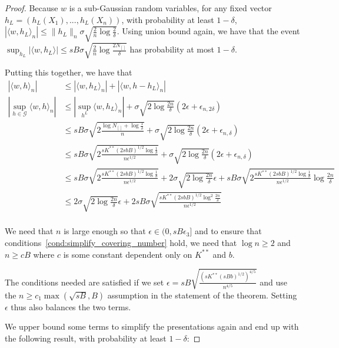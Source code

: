 \begin{proof}
Because $w$ is a sub-Gaussian random variables, for any fixed vector $h_L = (h_L(X_1),...,h_L(X_n))$, with probability at least $1-\delta$, $|\langle w, h_L \rangle_n | \leq \| h_L \|_n \sigma \sqrt{ \frac{2}{n} \log \frac{2}{\delta} }$. Using union bound again, we have that the event $\sup_{h_L} |\langle w, h_L \rangle| \leq sB \sigma \sqrt{ \frac{2}{n}\log \frac{2 N_{[]}}{\delta}}$ has probability at most $1-\delta$.

Putting this together, we have that
\begin{align*}
|\langle w, h \rangle_n | &\leq | \langle w, h_L\rangle_n| + |\langle w, h - h_L\rangle_n|\\
|\sup_{h \in \mathcal{G}} \langle w, h \rangle_n| &\leq 
     | \sup_{h^L} \langle w, h_L \rangle_n | + \sigma \sqrt{2 \log \frac{2n}{\delta}} (2\epsilon + \epsilon_{n, 2\delta}) \\
   &\leq   sB \sigma \sqrt{ 2 \frac{ \log N_{[]} + \log \frac{1}{\delta}}{n}} + \sigma \sqrt{2 \log \frac{2n}{\delta}} (2\epsilon + \epsilon_{n, \delta}) \\
   &\leq  sB \sigma \sqrt{ 2 \frac{sK^{**} (2sbB)^{1/2} \log \frac{1}{\delta}}{n \epsilon^{1/2}}} +
   \sigma \sqrt{ 2\log \frac{2n}{\delta}} (2\epsilon + \epsilon_{n, \delta}) \\
   &\leq sB \sigma \sqrt{ 2\frac{sK^{**} (2sbB)^{1/2} \log \frac{1}{\delta}}{n \epsilon^{1/2}}} +
   2\sigma\sqrt{2 \log \frac{2n}{\delta}} \epsilon + sB \sigma \sqrt{2 \frac{sK^{**} (2sbB)^{1/2}\log \frac{1}{\delta}}{n \epsilon^{1/2}} \log \frac{2n}{\delta}} \\
   &\leq 2\sigma\sqrt{2\log \frac{2n}{\delta}} \epsilon + 2 sB \sigma \sqrt{ \frac{sK^{**} (2sbB)^{1/2} \log^2 \frac{2n}{\delta}}{n \epsilon^{1/2}}} \\
\end{align*}

We need that $n$ is large enough so that $\epsilon \in (0, sB \epsilon_3]$ and to ensure that conditions~\ref{cond:simplify_covering_number} hold, we need that $\log n \geq 2$ and $n \geq c B$ where $c$ is some constant dependent only on $K^{**}$ and $b$.

The conditions needed are satisfied if we set $\epsilon = sB \sqrt{ \frac{(s K^{**} (sBb)^{1/2})^{4/5}}{n^{4/5}} }$ and use the $n \geq c_1 \max( \sqrt{sB}, B)$ assumption in the statement of the theorem. Setting $\epsilon$ thus also balances the two terms.


We upper bound some terms to simplify the presentations again and end up with the following result, with probability at least $1-\delta$:


\end{proof}
